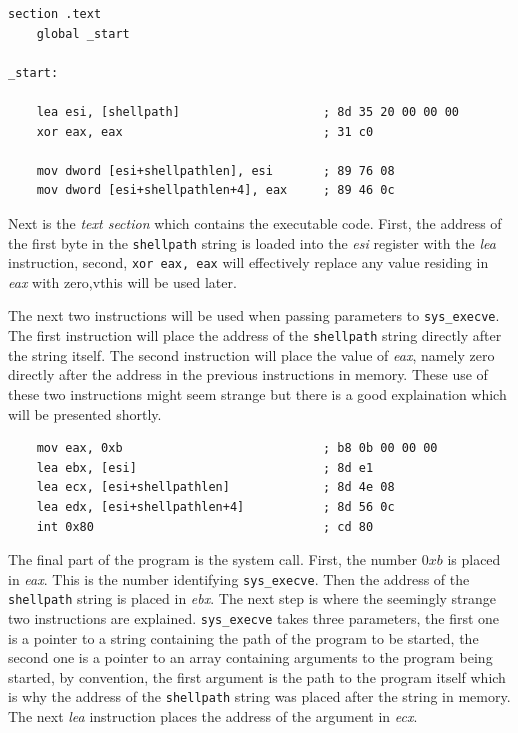 \documentclass[11pt,twoside]{eitExjobb}
\begin{document}
\begin{verbatim}
section .text
    global _start

_start:

    lea esi, [shellpath]                    ; 8d 35 20 00 00 00
    xor eax, eax                            ; 31 c0

    mov dword [esi+shellpathlen], esi       ; 89 76 08
    mov dword [esi+shellpathlen+4], eax     ; 89 46 0c

\end{verbatim}

\noindent Next is the \emph{text section} which contains the executable code. First, the address of the first byte in the \texttt{shellpath} string is loaded into the \emph{esi} register with the \emph{lea} instruction, second, \texttt{xor eax, eax} will effectively replace any value residing in \emph{eax} with zero,vthis will be used later. 

The next two instructions will be used when passing parameters to \texttt{sys\_execve}. The first instruction will place the address of the \texttt{shellpath} string directly after the string itself. The second instruction will place the value of \emph{eax}, namely zero directly after the address in the previous instructions in memory. These use of these two instructions might seem strange but there is a good explaination which will be presented shortly.

\begin{verbatim}
    mov eax, 0xb                            ; b8 0b 00 00 00
    lea ebx, [esi]                          ; 8d e1
    lea ecx, [esi+shellpathlen]             ; 8d 4e 08
    lea edx, [esi+shellpathlen+4]           ; 8d 56 0c
    int 0x80                                ; cd 80
\end{verbatim}

\noindent The final part of the program is the system call. First, the number $0xb$ is placed in \emph{eax}. This is the number identifying \texttt{sys\_execve}. Then the address of the \texttt{shellpath} string is placed in \emph{ebx}. The next step is where the seemingly strange two instructions are explained. \texttt{sys\_execve} takes three parameters, the first one is a pointer to a string containing the path of the program to be started, the second one is a pointer to an array containing arguments to the program being started, by convention, the first argument is the path to the program itself which is why the address of the \texttt{shellpath} string was placed after the string in memory. The next \emph{lea} instruction places the address of the argument in \emph{ecx}. 
\end{document}
